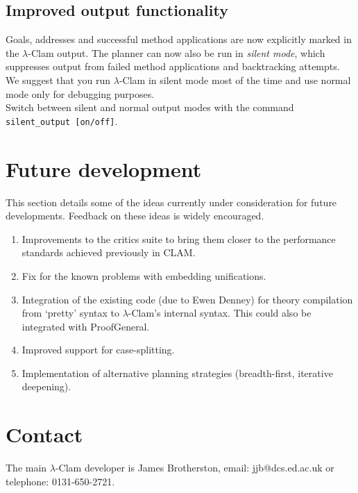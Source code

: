 \documentclass[11pt]{article}
\begin{document}
\subsection{Improved output functionality}

Goals, addresses and successful method applications are now explicitly
marked in the $\lambda$-Clam output.  The planner can now also be
run in \emph{silent mode}, which suppresses output from failed method
applications and backtracking attempts.  We suggest that you run
$\lambda$-Clam in silent mode most of the time and use normal mode only 
for debugging purposes. \\

\noindent Switch between silent and normal output modes with the command
\texttt{silent\_output [on/off]}.

\section{Future development}

This section details some of the ideas currently under consideration
for future developments.  Feedback on these ideas is widely encouraged.

\begin{enumerate}
\item Improvements to the critics suite to bring them closer to the
  performance standards achieved previously in CLAM.
\item Fix for the known problems with embedding unifications.
\item Integration of the existing code (due to Ewen Denney) for theory
  compilation from `pretty' syntax to $\lambda$-Clam's internal
  syntax.  This could also be integrated with ProofGeneral.
\item Improved support for case-splitting.
\item Implementation of alternative planning strategies
  (breadth-first, iterative deepening).
\end{enumerate}

\section{Contact}
The main $\lambda$-Clam developer is James Brotherston, email:
jjb@dcs.ed.ac.uk or telephone: 0131-650-2721.
\end{document}
